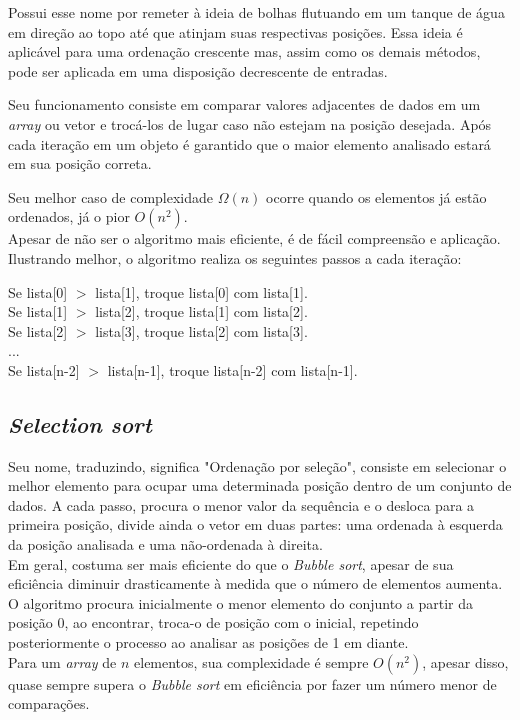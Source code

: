 \indent Possui esse nome por remeter à ideia de bolhas flutuando em um tanque de água em direção ao topo até que atinjam suas respectivas posições. Essa ideia é aplicável para uma ordenação crescente mas, assim como os demais métodos, pode ser aplicada em uma disposição decrescente de entradas.

\indent Seu funcionamento consiste em comparar valores adjacentes de dados em um \textit{array} ou vetor e trocá-los de lugar caso não estejam na posição desejada. Após cada iteração em um objeto é garantido que o maior elemento analisado estará em sua posição correta.

\indent Seu melhor caso de complexidade $\Omega(n)$ ocorre quando os elementos já estão ordenados, já o pior $O(n^2)$.\\
\indent Apesar de não ser o algoritmo mais eficiente, é de fácil compreensão e aplicação. Ilustrando melhor, o algoritmo realiza os seguintes passos a cada iteração:\\

\begin{center}
    Se lista[0] $>$ lista[1], troque lista[0] com lista[1].\\
    Se lista[1] $>$ lista[2], troque lista[1] com lista[2].\\
    Se lista[2] $>$ lista[3], troque lista[2] com lista[3].\\
    ...\\
    Se lista[n-2] $>$ lista[n-1], troque lista[n-2] com lista[n-1].\\
\end{center}

\subsection{\textit{Selection sort}} 

\indent Seu nome, traduzindo, significa "Ordenação por seleção", consiste em selecionar o melhor elemento para ocupar uma determinada posição dentro de um conjunto de dados. A cada passo, procura o menor valor da sequência e o desloca para a primeira posição, divide ainda o vetor em duas partes: uma ordenada à esquerda da posição analisada e uma não-ordenada à direita.\\
\indent Em geral, costuma ser mais eficiente do que o \textit{Bubble sort}, apesar de sua eficiência diminuir drasticamente à medida que o número de elementos aumenta.\\
\indent O algoritmo procura inicialmente o menor elemento do conjunto a partir da posição 0, ao encontrar, troca-o de posição com o inicial, repetindo posteriormente o processo ao analisar as posições de 1 em diante.\\
\indent Para um \textit{array} de $n$ elementos, sua complexidade é sempre $O(n^2)$, apesar disso, quase sempre supera o \textit{Bubble sort} em eficiência por fazer um número menor de comparações.\cite{zanoni} \cite{backes}\\

